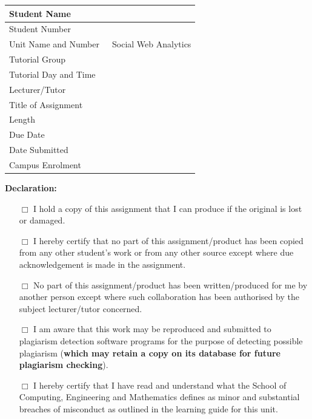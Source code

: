 \documentclass[a4paper,oneside]{book}
\newcommand{\unitcode}{300958}
\newcommand{\unitname}{Social Web Analytics}
\begin{document}
\begin{center}
\renewcommand{\arraystretch}{2}
\begin{tabular}{|>{\raggedright}p{}|>{\raggedright\arraybackslash}p{}|}
\hline
Student Name & \\
\hline
Student Number & \\
\hline
Unit Name and Number & \unitcode~\unitname \\
\hline
Tutorial Group & \\
\hline
Tutorial Day and Time & \\
\hline
Lecturer/Tutor & \\
\hline
Title of Assignment & \\
\hline
Length & \\
\hline
Due Date & \\
\hline
Date Submitted & \\
\hline
Campus Enrolment & \\
\hline
\end{tabular}
\renewcommand{\arraystretch}{1.3}
\end{center}
\textbf{Declaration:}
\begin{itemize}
\item[$\Box$] I hold a copy of this assignment that I can produce if the original is
lost or damaged.

\item[$\Box$] I hereby certify that no part of this assignment/product has been
copied from any other student's work or from any other source except
where due acknowledgement is made in the assignment.  

\item[$\Box$] No part of this assignment/product has been written/produced for me by
another person except where such collaboration has been authorised by
the subject lecturer/tutor concerned.

\item[$\Box$] I am aware that this work may be reproduced and submitted to
plagiarism detection software programs for the purpose of detecting
possible plagiarism (\textbf{which may retain a copy on its database for
future plagiarism checking}).

\item[$\Box$] I hereby certify that I have read and understand what the School of
Computing, Engineering and Mathematics defines as minor and substantial breaches of
misconduct as outlined in the learning guide for this unit.
\end{itemize}
\end{document}
